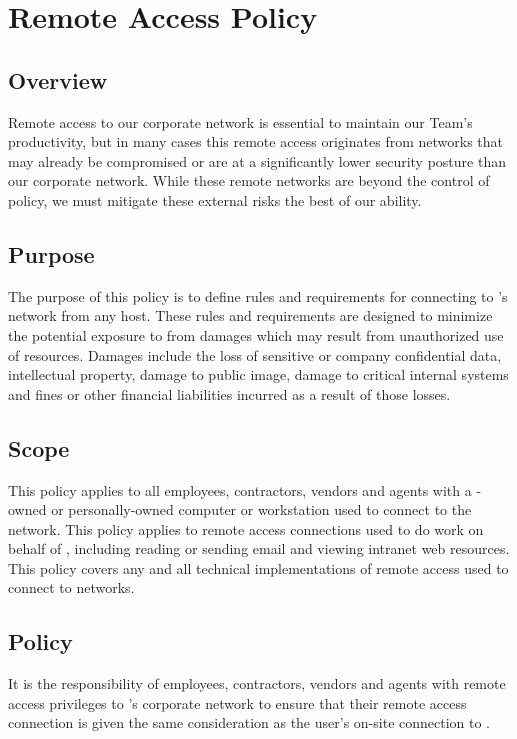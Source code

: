 \chapter{Remote Access Policy}\label{NS:RAP}
\section{Overview}
Remote access to our corporate network is essential to maintain our Team's productivity, but in many cases this remote access originates from networks that may already be compromised or are at a significantly lower security posture than our corporate network.  
While these remote networks are beyond the control of \CompanyName{} policy, we must mitigate these external risks the best of our ability.

\section{Purpose}
The purpose of this policy is to define rules and requirements for connecting to \CompanyName{}'s network from any host.  
These rules and requirements are designed to minimize the potential exposure to \CompanyName{} from damages which may result from unauthorized use of \CompanyName{} resources.  
Damages include the loss of sensitive or company confidential data, intellectual property, damage to public image, damage to critical \CompanyName{} internal systems\oxford{} and fines or other financial liabilities incurred as a result of those losses.

\section{Scope}
This policy applies to all \CompanyName{} employees, contractors, vendors\oxford{} and agents with a \CompanyName{}-owned or personally-owned computer or workstation used to connect to the \CompanyName{} network.  
This policy applies to remote access connections used to do work on behalf of \CompanyName{}, including reading or sending email and viewing intranet web resources.  
This policy covers any and all technical implementations of remote access used to connect to \CompanyName{} networks.

\section{Policy}
It is the responsibility of \CompanyName{} employees, contractors, vendors\oxford{} and agents with remote access privileges to \CompanyName{}'s corporate network to ensure that their remote access connection is given the same consideration as the user's on-site connection to \CompanyName{}. 

